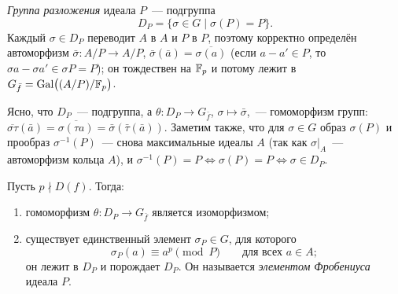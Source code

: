 \begin{definition}[4.27d]
\emph{Группа разложения} идеала $P$~--- подгруппа
\[
D_P=\{\sigma\in G\mid\sigma(P)=P\}.
\]
Каждый $\sigma\in D_P$ переводит $A$ в $A$ и $P$ в $P$, поэтому корректно определён автоморфизм
$\bar\sigma\colon A/P\to A/P$, $\bar\sigma(\bar a)=\overline{\sigma(a)}$ (если $a-a'\in P$, то $\sigma a-\sigma a'\in\sigma P=P$);
он тождествен на $\mathbb F_p$ и потому лежит в $G_{\bar f}=\operatorname{Gal}\bigl((A/P)/\mathbb F_p\bigr)$.
\end{definition}

Ясно, что $D_P$~--- подгруппа, а $\theta\colon D_P\to G_{\bar f}$, $\sigma\mapsto\bar\sigma$,~--- гомоморфизм групп:
$\overline{\sigma\tau}(\bar a)=\overline{\sigma(\tau a)}=\bar\sigma(\bar\tau(\bar a))$. Заметим также, что для
$\sigma\in G$ образ $\sigma(P)$ и прообраз $\sigma^{-1}(P)$~--- снова максимальные идеалы $A$ (так как $\sigma|_A$~---
автоморфизм кольца $A$), и $\sigma^{-1}(P)=P\iff\sigma(P)=P\iff\sigma\in D_P$.

\begin{proposition}[4.27e]
Пусть $p\nmid D(f)$. Тогда:
\begin{enumerate}[label=\textup{(\alph*)}]
\item гомоморфизм $\theta\colon D_P\to G_{\bar f}$ является изоморфизмом;
\item существует единственный элемент $\sigma_P\in G$, для которого
\begin{equation}\label{eq:s6-frob}
\sigma_P(a)\equiv a^p\pmod P\qquad\text{для всех }a\in A;
\end{equation}
он лежит в $D_P$ и порождает $D_P$. Он называется \emph{элементом Фробениуса} идеала $P$.
\end{enumerate}
\end{proposition}

